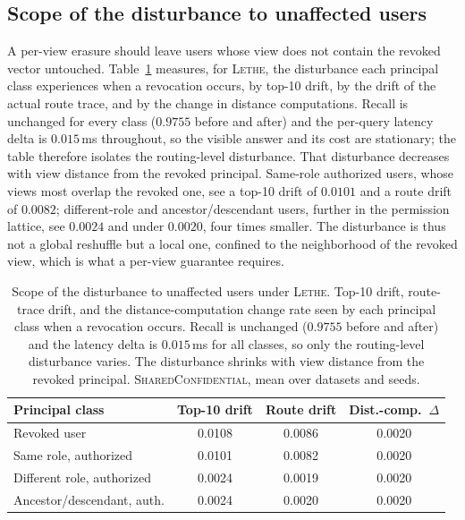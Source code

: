 \documentclass[sigconf, nonacm, review]{acmart}
\begin{document}
\subsection{Scope of the disturbance to unaffected users}
\label{app:viewscope}
A per-view erasure should leave users whose view does not contain the revoked
vector untouched. Table~\ref{tab:viewscope} measures, for \textsc{Lethe}, the
disturbance each principal class experiences when a revocation occurs, by
top-10 drift, by the drift of the actual route trace, and by the change in
distance computations. Recall is unchanged for every class
($0.9755$ before and after) and the per-query latency delta is $0.015$\,ms
throughout, so the visible answer and its cost are stationary; the table
therefore isolates the routing-level disturbance. That disturbance decreases
with view distance from the revoked principal. Same-role authorized users, whose
views most overlap the revoked one, see a top-10 drift of $0.0101$ and a route
drift of $0.0082$; different-role and ancestor/descendant users, further in the
permission lattice, see $0.0024$ and under $0.0020$, four times smaller. The
disturbance is thus not a global reshuffle but a local one, confined to the
neighborhood of the revoked view, which is what a per-view guarantee requires.

\begin{table}[t]
\centering
\caption{Scope of the disturbance to unaffected users under \textsc{Lethe}.
Top-10 drift, route-trace drift, and the distance-computation change rate seen by
each principal class when a revocation occurs. Recall is unchanged ($0.9755$
before and after) and the latency delta is $0.015$\,ms for all classes, so only
the routing-level disturbance varies. The disturbance shrinks with view distance
from the revoked principal. \textsc{SharedConfidential}, mean over datasets and
seeds.}
\label{tab:viewscope}
\small
\setlength{\tabcolsep}{5pt}
\begin{tabular}{@{}lccc@{}}
\toprule
Principal class & Top-10 drift & Route drift & Dist.-comp.\ $\Delta$ \\
\midrule
Revoked user & 0.0108 & 0.0086 & 0.0020 \\
Same role, authorized & 0.0101 & 0.0082 & 0.0020 \\
Different role, authorized & 0.0024 & 0.0019 & 0.0020 \\
Ancestor/descendant, auth. & 0.0024 & 0.0020 & 0.0020 \\
\bottomrule
\end{tabular}
\end{table}
\end{document}
